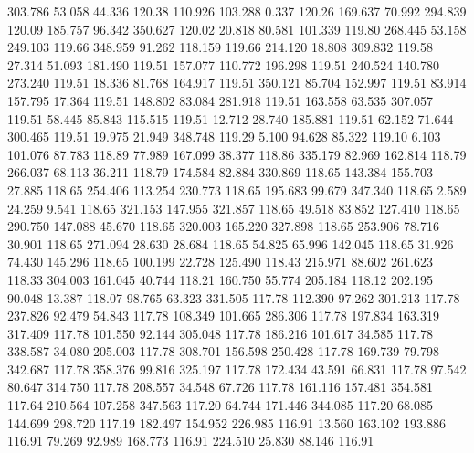  303.786   53.058   44.336       120.38
 110.926  103.288    0.337       120.26
 169.637   70.992  294.839       120.09
 185.757   96.342  350.627       120.02
  20.818   80.581  101.339       119.80
 268.445   53.158  249.103       119.66
 348.959   91.262  118.159       119.66
 214.120   18.808  309.832       119.58
  27.314   51.093  181.490       119.51
 157.077  110.772  196.298       119.51
 240.524  140.780  273.240       119.51
  18.336   81.768  164.917       119.51
 350.121   85.704  152.997       119.51
  83.914  157.795   17.364       119.51
 148.802   83.084  281.918       119.51
 163.558   63.535  307.057       119.51
  58.445   85.843  115.515       119.51
  12.712   28.740  185.881       119.51
  62.152   71.644  300.465       119.51
  19.975   21.949  348.748       119.29
   5.100   94.628   85.322       119.10
   6.103  101.076   87.783       118.89
  77.989  167.099   38.377       118.86
 335.179   82.969  162.814       118.79
 266.037   68.113   36.211       118.79
 174.584   82.884  330.869       118.65
 143.384  155.703   27.885       118.65
 254.406  113.254  230.773       118.65
 195.683   99.679  347.340       118.65
   2.589   24.259    9.541       118.65
 321.153  147.955  321.857       118.65
  49.518   83.852  127.410       118.65
 290.750  147.088   45.670       118.65
 320.003  165.220  327.898       118.65
 253.906   78.716   30.901       118.65
 271.094   28.630   28.684       118.65
  54.825   65.996  142.045       118.65
  31.926   74.430  145.296       118.65
 100.199   22.728  125.490       118.43
 215.971   88.602  261.623       118.33
 304.003  161.045   40.744       118.21
 160.750   55.774  205.184       118.12
 202.195   90.048   13.387       118.07
  98.765   63.323  331.505       117.78
 112.390   97.262  301.213       117.78
 237.826   92.479   54.843       117.78
 108.349  101.665  286.306       117.78
 197.834  163.319  317.409       117.78
 101.550   92.144  305.048       117.78
 186.216  101.617   34.585       117.78
 338.587   34.080  205.003       117.78
 308.701  156.598  250.428       117.78
 169.739   79.798  342.687       117.78
 358.376   99.816  325.197       117.78
 172.434   43.591   66.831       117.78
  97.542   80.647  314.750       117.78
 208.557   34.548   67.726       117.78
 161.116  157.481  354.581       117.64
 210.564  107.258  347.563       117.20
  64.744  171.446  344.085       117.20
  68.085  144.699  298.720       117.19
 182.497  154.952  226.985       116.91
  13.560  163.102  193.886       116.91
  79.269   92.989  168.773       116.91
 224.510   25.830   88.146       116.91
